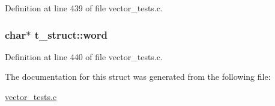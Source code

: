 Definition at line 439 of file vector\_\-tests.c.

\hypertarget{structt__struct_ad78db3e317b59f63dec93a023412619d}{
\subsubsection[{word}]{\setlength{\rightskip}{0pt plus 5cm}char$\ast$ {\bf t\_\-struct::word}}}
\label{structt__struct_ad78db3e317b59f63dec93a023412619d}


Definition at line 440 of file vector\_\-tests.c.



The documentation for this struct was generated from the following file:\begin{DoxyCompactItemize}
\item 
\hyperlink{vector__tests_8c}{vector\_\-tests.c}\end{DoxyCompactItemize}
